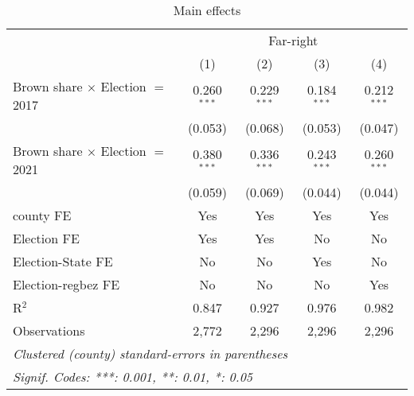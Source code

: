 \begin{table}[htbp]
   \caption{Main effects}
   \centering
   \begin{tabular}{lcccc}
      \tabularnewline \midrule \midrule
       & \multicolumn{4}{c}{Far-right}\\
                                              & (1)           & (2)           & (3)           & (4)\\  
      Brown share $\times$ Election $=$ 2017  & 0.260$^{***}$ & 0.229$^{***}$ & 0.184$^{***}$ & 0.212$^{***}$\\   
                                              & (0.053)       & (0.068)       & (0.053)       & (0.047)\\   
      Brown share $\times$ Election $=$ 2021  & 0.380$^{***}$ & 0.336$^{***}$ & 0.243$^{***}$ & 0.260$^{***}$\\   
                                              & (0.059)       & (0.069)       & (0.044)       & (0.044)\\   
      county FE                               & Yes           & Yes           & Yes           & Yes\\  
      Election FE                             & Yes           & Yes           & No            & No\\  
      Election-State FE                       & No            & No            & Yes           & No\\  
      Election-regbez FE                      & No            & No            & No            & Yes\\  
      R$^2$                                   & 0.847         & 0.927         & 0.976         & 0.982\\  
      Observations                            & 2,772         & 2,296         & 2,296         & 2,296\\  
      \midrule \midrule
      \multicolumn{5}{l}{\emph{Clustered (county) standard-errors in parentheses}}\\
      \multicolumn{5}{l}{\emph{Signif. Codes: ***: 0.001, **: 0.01, *: 0.05}}\\
   \end{tabular}
\end{table}



